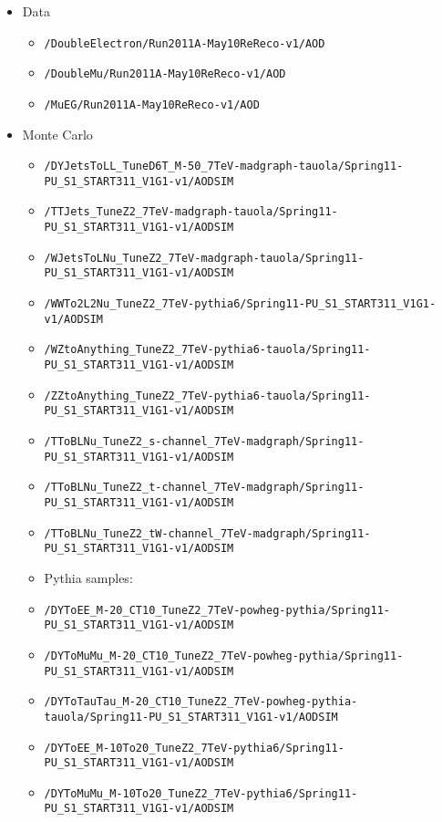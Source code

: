 \begin{itemize}
\item Data 
\begin{itemize}
\item \verb=/DoubleElectron/Run2011A-May10ReReco-v1/AOD=
\item \verb=/DoubleMu/Run2011A-May10ReReco-v1/AOD=
\item \verb=/MuEG/Run2011A-May10ReReco-v1/AOD=

\end{itemize}

\item Monte Carlo
\begin{itemize} 
\item \verb=/DYJetsToLL_TuneD6T_M-50_7TeV-madgraph-tauola/Spring11-PU_S1_START311_V1G1-v1/AODSIM=
\item \verb=/TTJets_TuneZ2_7TeV-madgraph-tauola/Spring11-PU_S1_START311_V1G1-v1/AODSIM=
\item \verb=/WJetsToLNu_TuneZ2_7TeV-madgraph-tauola/Spring11-PU_S1_START311_V1G1-v1/AODSIM=
\item \verb=/WWTo2L2Nu_TuneZ2_7TeV-pythia6/Spring11-PU_S1_START311_V1G1-v1/AODSIM=
\item \verb=/WZtoAnything_TuneZ2_7TeV-pythia6-tauola/Spring11-PU_S1_START311_V1G1-v1/AODSIM=
\item \verb=/ZZtoAnything_TuneZ2_7TeV-pythia6-tauola/Spring11-PU_S1_START311_V1G1-v1/AODSIM=
\item \verb=/TToBLNu_TuneZ2_s-channel_7TeV-madgraph/Spring11-PU_S1_START311_V1G1-v1/AODSIM=
\item \verb=/TToBLNu_TuneZ2_t-channel_7TeV-madgraph/Spring11-PU_S1_START311_V1G1-v1/AODSIM=
\item \verb=/TToBLNu_TuneZ2_tW-channel_7TeV-madgraph/Spring11-PU_S1_START311_V1G1-v1/AODSIM=
\item Pythia samples:
\item \verb=/DYToEE_M-20_CT10_TuneZ2_7TeV-powheg-pythia/Spring11-PU_S1_START311_V1G1-v1/AODSIM=
\item \verb=/DYToMuMu_M-20_CT10_TuneZ2_7TeV-powheg-pythia/Spring11-PU_S1_START311_V1G1-v1/AODSIM=
\item \verb=/DYToTauTau_M-20_CT10_TuneZ2_7TeV-powheg-pythia-tauola/Spring11-PU_S1_START311_V1G1-v1/AODSIM=
\item \verb=/DYToEE_M-10To20_TuneZ2_7TeV-pythia6/Spring11-PU_S1_START311_V1G1-v1/AODSIM=
\item \verb=/DYToMuMu_M-10To20_TuneZ2_7TeV-pythia6/Spring11-PU_S1_START311_V1G1-v1/AODSIM=
\end{itemize}
\end{itemize}


